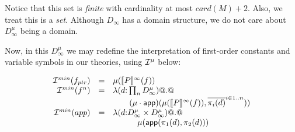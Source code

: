 \begin{itemize}
  Notice that this set is {\em finite} with cardinality at most $card(M) + 2$. Also,
  we treat this is a {\em set}. Although $D_\infty$ has a domain structure, we do not
  care about $D_\infty^\mu$ being a domain.

  Now, in this $D_\infty^\mu$ we may redefine the interpretation of first-order constants
  and variable symbols in our theories, using ${\cal I}^\mu$ below:


  {\setlength{\arraycolsep}{2pt}
  \[\begin{array}{rcl}
     {\cal I}^{min}(f_{ptr}) & = & \mu([\![P]\!]^{\infty}(f)) \\
   {\cal I}^{min}(f^{n})  & = & \mathsf{\lambda} (d {:} \prod_{n}D_{\infty}^\mu) @.@  \\
                       &   & \quad\quad (\mu\cdot\mathsf{app})(\mu([\![P]\!]^{\infty}(f)),\overline{\pi_i(d)}^{i \in 1..n})) \\

   {\cal I}^{min}(app)     & = & \mathsf{\lambda} (d {:} D_{\infty}^\mu \times D_{\infty}^\mu) @.@ \\ \
                      &   & \quad\qquad \mu(\mathsf{app}(\pi_1(d),\pi_2(d))) \\ \\


\end{array}\]}
\end{itemize}
